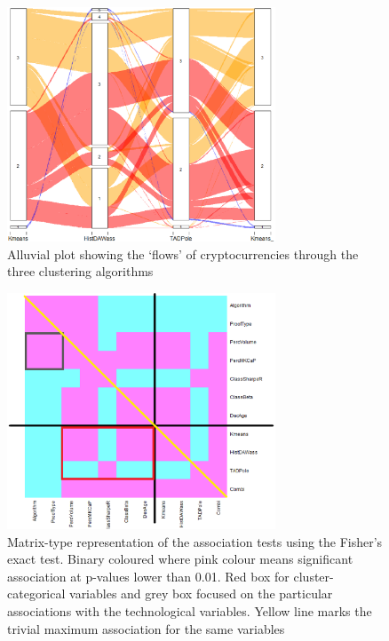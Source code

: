 \documentclass{bmcart}
\begin{document}
\begin{backmatter}
\begin{figure}[h!]
	\centering
	\includegraphics[width=80mm]{Aluvion3B.eps}
	\caption{Alluvial plot showing the `flows' of cryptocurrencies through the three clustering algorithms}
	\label{fig:PairingAluvion}
\end{figure}

\begin{figure}[h!]
	\centering
	\includegraphics[width=80mm]{HeatMapFisherRevA3.eps}
	\caption{Matrix-type representation of the association tests using the Fisher's exact test. Binary coloured where pink colour means significant association at p-values lower than 0.01. Red box for cluster-categorical variables and grey box focused on the particular associations with the technological variables. Yellow line marks the trivial maximum association for the same variables} 
	\label{fig:HeatMapFisher}
\end{figure}


\end{backmatter}
\end{document}
